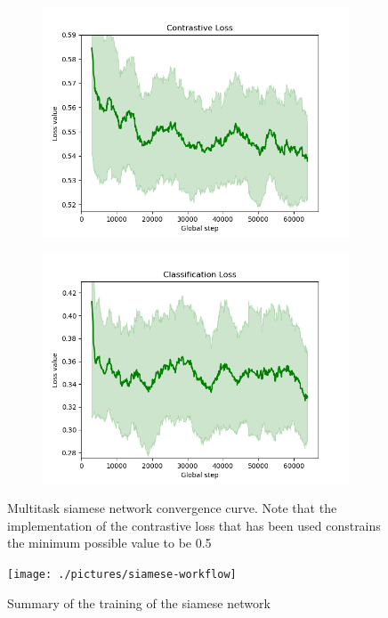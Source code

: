 \begin{figure}[h!]
    \centering
    \captionsetup{justification=centering}
    \begin{subfigure}[t]{\textwidth}
        \includegraphics[width=\textwidth]{./pictures/contrastive-loss}
    \end{subfigure}\vspace{3mm}
    \begin{subfigure}[t]{\textwidth}
        \includegraphics[width=\textwidth]{./pictures/classification-loss}
    \end{subfigure}
    \caption{Multitask siamese network convergence curve. Note that the implementation of the contrastive loss that has been used constrains the minimum possible value to be 0.5}
    \label{fig:siamese-training}
\end{figure}
\begin{figure}[hb!]
  \centering
  \captionsetup{justification=centering}
  \texttt{[image: ./pictures/siamese-workflow]}
  \caption{Summary of the training of the siamese network}
  \label{fig:siamese-workflow}
\end{figure}
\clearpage
